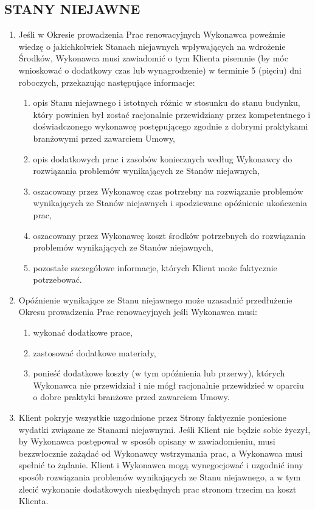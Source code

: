 \begin{multicols}{2}
\subsection{STANY NIEJAWNE}
\begin{enumerate}
	\item Jeśli w Okresie prowadzenia Prac renowacyjnych Wykonawca poweźmie wiedzę o jakichkolwiek Stanach niejawnych wpływających na wdrożenie Środków, Wykonawca musi zawiadomić o tym Klienta pisemnie (by móc wnioskować o dodatkowy czas lub wynagrodzenie) w terminie 5 (pięciu) dni roboczych, przekazując następujące informacje:
	\begin{enumerate}
		\item opis Stanu niejawnego i istotnych różnic w stosunku do stanu budynku, który powinien był zostać racjonalnie przewidziany przez kompetentnego i doświadczonego wykonawcę postępującego zgodnie z dobrymi praktykami branżowymi przed zawarciem Umowy,
		\item opis dodatkowych prac i zasobów koniecznych według Wykonawcy do rozwiązania problemów wynikających ze Stanów niejawnych,
		\item oszacowany przez Wykonawcę czas potrzebny na rozwiązanie problemów wynikających ze Stanów niejawnych i spodziewane opóźnienie ukończenia prac,
		\item oszacowany przez Wykonawcę koszt środków potrzebnych do rozwiązania problemów wynikających ze Stanów niejawnych,
		\item pozostałe szczegółowe informacje, których Klient może faktycznie potrzebować.
	\end{enumerate}
	\item Opóźnienie wynikające ze Stanu niejawnego może uzasadnić przedłużenie Okresu prowadzenia Prac renowacyjnych jeśli Wykonawca musi:
	\begin{enumerate}
		\item wykonać dodatkowe prace,
		\item zastosować dodatkowe materiały,
		\item ponieść dodatkowe koszty (w tym opóźnienia lub przerwy), których Wykonawca nie przewidział i nie mógł racjonalnie przewidzieć w oparciu o dobre praktyki branżowe przed zawarciem Umowy.
	\end{enumerate}
	\item Klient pokryje wszystkie uzgodnione przez Strony faktycznie poniesione wydatki związane ze Stanami niejawnymi. Jeśli Klient nie będzie sobie życzył, by Wykonawca postępował w sposób opisany w zawiadomieniu, musi bezzwłocznie zażądać od Wykonawcy wstrzymania prac, a Wykonawca musi spełnić to żądanie. Klient i Wykonawca mogą wynegocjować i uzgodnić inny sposób rozwiązania problemów wynikających ze Stanu niejawnego, a w tym zlecić wykonanie dodatkowych niezbędnych prac stronom trzecim na koszt Klienta.

\end{enumerate}
\end{multicols}
